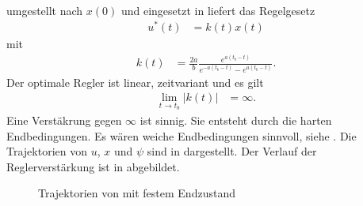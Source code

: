 \begin{exmp}
\begin{align}
\begin{split}
\end{split}
\end{align}
 umgestellt nach $x(0)$ und eingesetzt in  liefert das Regelgesetz
\begin{align}
	u^{\ast}(t) & = k(t) x(t)
\end{align}
mit
\begin{align*}
	k(t) & = \frac{2a}{b}\frac{e^{a(t_b-t)}}{e^{-a(t_b-t)}-e^{a(t_b-t)}}.
\end{align*}
Der optimale Regler ist linear, zeitvariant und es gilt
\begin{align*}
	\lim\limits_{t\rightarrow t_b}\left|k(t)\right| & = \infty.
\end{align*}
Eine Verstäkrung gegen $\infty$ ist sinnig. Sie entsteht durch die harten Endbedingungen. Es wären weiche Endbedingungen sinnvoll, siehe
. Die Trajektorien von $u$, $x$ und $\psi$ sind in  dargestellt. Der Verlauf der
Reglerverstärkung ist in  abgebildet. 
\end{exmp}
\begin{figure}[htb]
	\centering
	
	\caption{Trajektorien von  mit festem Endzustand}
	\label{fig:kap_2_vor_optlsg_exmp_1}
\end{figure}
